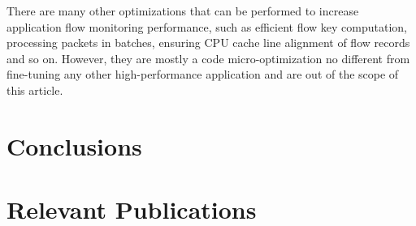 There are many other optimizations that can be performed to increase application flow monitoring performance, such as efficient flow key computation, processing packets in batches, ensuring CPU cache line alignment of flow records and so on. However, they are mostly a code micro-optimization no different from fine-tuning any other high-performance application and are out of the scope of this article.


\section{Conclusions}

\section{Relevant Publications}
